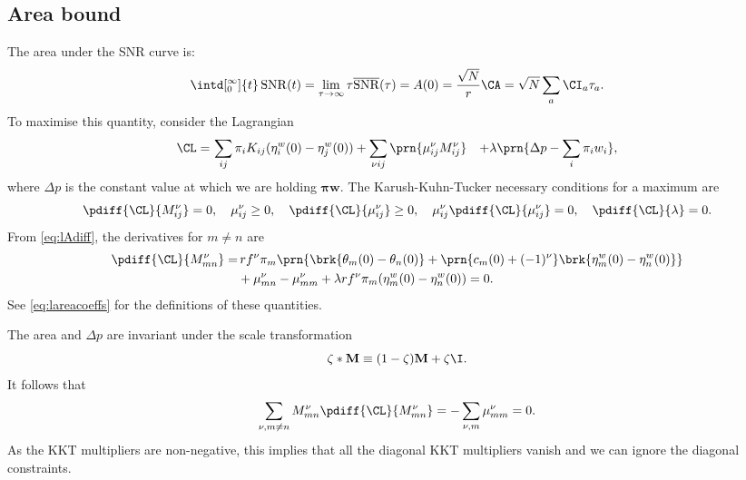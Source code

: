 \documentclass[12pt]{article}
\newcommand{\eqm}{\pi}
\newcommand{\eq}{\boldsymbol{\eqm}}
\newcommand{\etwm}{\eta^w}
\newcommand{\thbm}{\theta}
\newcommand{\wm}{w}
\newcommand{\w}{\mathbf{\wm}}
\newcommand{\MMdm}{M}
\newcommand{\MMd}{\mathbf{\MMdm}}
\newcommand{\encm}{K}
\newcommand{\kktm}{\mu}
\DeclareMathOperator{\snr}{SNR}
\newcommand{\snrb}{\overline{\snr}}
\begin{document}

\subsection{Area bound}\label{sec:area}

The area under the SNR curve is:
%
\begin{equation}\label{eq:areadef}
  \intd[_0^\infty]{t} \snr(t) = \lim_{\tau\to\infty} \tau \snrb(\tau) 
      = A(0) = \frac{\sqrt{N}}{r} \CA = \sqrt{N} \sum_a \CI_a \tau_a.
\end{equation}
%
To maximise this quantity, consider the Lagrangian
%
\begin{equation}\label{eq:arealagrangian}
\begin{aligned}
  \CL =&\, \sum_{ij} \eqm_i \encm_{ij} (\etwm_i(0) - \etwm_j(0))
        +\sum_{\nu i j} \prn{ \kktm^\nu_{ij} \MMdm^\nu_{ij} }
        &+ \lambda \prn{ \Delta p - \sum_i \eqm_i \wm_i },
\end{aligned}
\end{equation}
%
where \(\Delta p\) is the constant value at which we are holding \(\eq\w\).
The Karush-Kuhn-Tucker necessary conditions for a maximum are
%
\begin{equation}\label{eq:KTarea}
  \pdiff{\CL}{\MMdm^\nu_{ij}} = 0, \quad
  \kktm^\nu_{ij} \geq 0, \quad
  \pdiff{\CL}{\kktm^\nu_{ij}} \geq 0, \quad
  \kktm^\nu_{ij}\pdiff{\CL}{\kktm^\nu_{ij}} = 0, \quad
  \pdiff{\CL}{\lambda} = 0.
\end{equation}
%
From \cref{eq:lAdiff}, the derivatives for \(m \neq n\) are
%
\begin{equation}\label{eq:areaderivs}
\begin{aligned}
  \pdiff{\CL}{\MMdm^\nu_{mn}} = & \,
    r f^\nu \eqm_m \prn{ \brk{\thbm_m(0) - \thbm_n(0)}
     + \prn{c_m(0) + (-1)^\nu} \brk{\etwm_m(0) - \etwm_n(0)} } \\
     &+ \kktm^\nu_{mn} -  \kktm^\nu_{mm}
     + \lambda r f^\nu \eqm_m (\etwm_{m}(0)-\etwm_{n}(0)) 
    = 0.
\end{aligned}
\end{equation}
%
See \cref{eq:lareacoeffs} for the definitions of these quantities.

The area and \(\Delta p\) are invariant under the scale transformation %
%
\begin{equation}\label{eq:scale}
  \zeta * \MMd \equiv (1-\zeta) \MMd + \zeta \I .
\end{equation}
%
It follows that
%
\begin{equation*}
  \sum_{\nu, m \neq n} \MMdm^\nu_{mn} \pdiff{\CL}{\MMdm^\nu_{mn}} 
    = - \sum_{\nu, m} \kktm^\nu_{mm} = 0 .
\end{equation*}
%
As the KKT multipliers are non-negative, this implies that all the diagonal KKT multipliers vanish and we can ignore the diagonal constraints.
\end{document}
